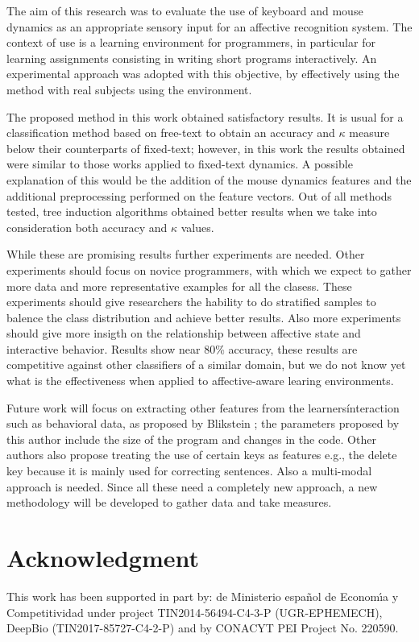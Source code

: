 \documentclass[a4paper,twoside]{article}
\begin{document}
The aim of this research was to evaluate the use of keyboard and mouse dynamics
as an appropriate sensory input for an affective recognition system. The context
of use is a learning environment for programmers, in particular for learning
assignments consisting in writing short programs interactively. An experimental
approach was adopted with this objective, by effectively using the
method with real subjects using the environment.

The proposed method in this work obtained
satisfactory results. It is usual for a classification method based on free-text
to obtain an accuracy and $\kappa$ measure below their counterparts of
fixed-text; however, in this
work the results obtained were similar to those works applied to fixed-text
dynamics. A possible explanation of this would be the addition of the mouse
dynamics features and the additional preprocessing performed on the
feature vectors.  Out of all methods tested, tree induction algorithms
obtained better results when we take into consideration both accuracy and  $\kappa$ values.

While these are promising results further experiments are
needed. Other experiments should focus on novice programmers, with
which we expect to gather more data and more representative examples for all the
clasess. These experiments should give researchers the hability to do stratified samples to balence
the class distribution and achieve better results. Also more experiments should
give more insigth on the relationship between affective state  and interactive
behavior. Results show near 80\% accuracy, these results  are competitive
against other classifiers of a similar domain, but we do not know yet what is
the effectiveness when applied to affective-aware learing environments.   

Future work will focus on extracting other features from the learners\' interaction such as behavioral data, as proposed by Blikstein
\cite{blikstein2011using}; the parameters proposed by this author
include the size of the program and changes in the code. Other authors
also propose treating the use of certain keys as features e.g., the
delete key because it is mainly used for correcting sentences. Also a multi-modal approach is needed. Since all these need a completely new approach, a new methodology will be developed to
gather data and take measures.

\section*{Acknowledgment}
This work has been supported in part by: de Ministerio espa\~{n}ol de
Econom\'{\i}a y Competitividad under project TIN2014-56494-C4-3-P
(UGR-EPHEMECH),  DeepBio (TIN2017-85727-C4-2-P) and by CONACYT PEI Project No. 220590.




\vfill
\end{document}
